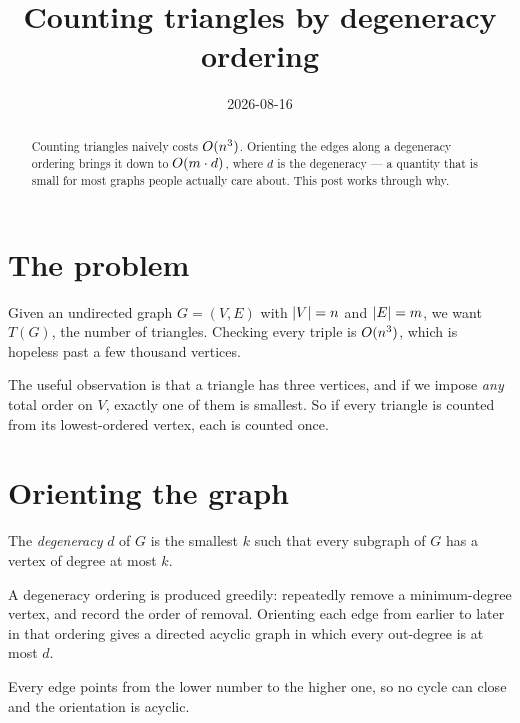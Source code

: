 \documentclass[11pt]{article}
\title{Counting triangles by degeneracy ordering}
\date{2026-08-16}
\begin{document}
\begin{abstract}
Counting triangles naively costs $O(n^3)$. Orienting the edges along a
degeneracy ordering brings it down to $O(m \cdot d)$, where $d$ is the
degeneracy --- a quantity that is small for most graphs people actually care
about. This post works through why.
\end{abstract}

\section{The problem}

Given an undirected graph $G = (V, E)$ with $\lvert V\rvert = n$ and $\lvert E\rvert = m$, we
want $T(G)$, the number of triangles. Checking every triple is $O(n^3)$,
which is hopeless past a few thousand vertices.

The useful observation is that a triangle has three vertices, and if we impose
\emph{any} total order on $V$, exactly one of them is smallest. So if every
triangle is counted from its lowest-ordered vertex, each is counted once.

\section{Orienting the graph}

\begin{definition}[Degeneracy]
The \emph{degeneracy} $d$ of $G$ is the smallest $k$ such that every subgraph
of $G$ has a vertex of degree at most $k$.
\end{definition}

A degeneracy ordering is produced greedily: repeatedly remove a
minimum-degree vertex, and record the order of removal. Orienting each edge
from earlier to later in that ordering gives a directed acyclic graph in which
every out-degree is at most $d$.


Every edge points from the lower number to the higher one, so no cycle can
close and the orientation is acyclic.
\end{document}
